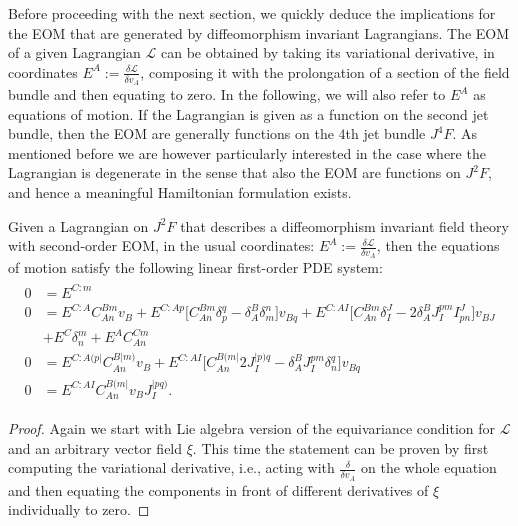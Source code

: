 Before proceeding with the next section, we quickly deduce the implications for the EOM that are generated by diffeomorphism invariant Lagrangians. The EOM of a given Lagrangian $\mathcal{L}$ can be obtained by taking its variational derivative, in coordinates $E^A := \frac{\delta \mathcal{L}}{\delta v_A}$, composing it with the prolongation of a section of the field bundle and then equating to zero. In the following, we will also refer to $E^A$ as equations of motion. If the Lagrangian is given as a function on the second jet bundle, then the EOM are generally functions on the $4$th jet bundle $J^4F$. As mentioned before we are however particularly interested in the case where the Lagrangian is degenerate in the sense that also the EOM are functions on $J^2F$, and hence a meaningful Hamiltonian formulation exists.
\begin{theorem}
Given a Lagrangian on $J^2F$ that describes a diffeomorphism invariant field theory with second-order EOM, in the usual coordinates: $E^A := \frac{\delta \mathcal{L}}{\delta v_A}$, then the equations of motion satisfy the following linear first-order PDE system:
\begin{align}\label{EOM}
    \begin{aligned}
    0 &= E^{C:m} \\
    0 &= E^{C:A} C_{An}^{Bm} v_B + E^{C:Ap} \bigl[ C_{An}^{Bm} \delta_p^q - \delta_A^B \delta_m^n \bigr] v_{Bq} + E^{C:AI} \bigl[ C_{An}^{Bm} \delta_I^J - 2 \delta_A^B J_I^{pm} I^J_{pn}  \bigr] v_{BJ}\\
    &+ E^C \delta^m_n + E^A C_{An}^{Cm}  \\
    0 &= E^{C:A(p\vert}C_{An}^{B \vert m)} v_B + E^{C: AI} \bigl[ C_{An}^{B(m\vert} 2 J_I^{\vert p) q} - \delta^B_A J_I ^{pm} \delta_n^q \bigr] v_{Bq} \\
    0 &= E^{C:AI} C_{An}^{B(m\vert} v_B J_I^{\vert p q )}.
    \end{aligned}
\end{align}
\end{theorem}
\begin{proof}
Again we start with Lie algebra version of the equivariance condition for $\mathcal{L}$ and an arbitrary vector field $\xi$. This time the statement can be proven by first computing the variational derivative, i.e., acting with $\frac{\delta}{\delta v_A}$ on the whole equation and then equating the components in front of different derivatives of $\xi$ individually to zero. 
\end{proof}

